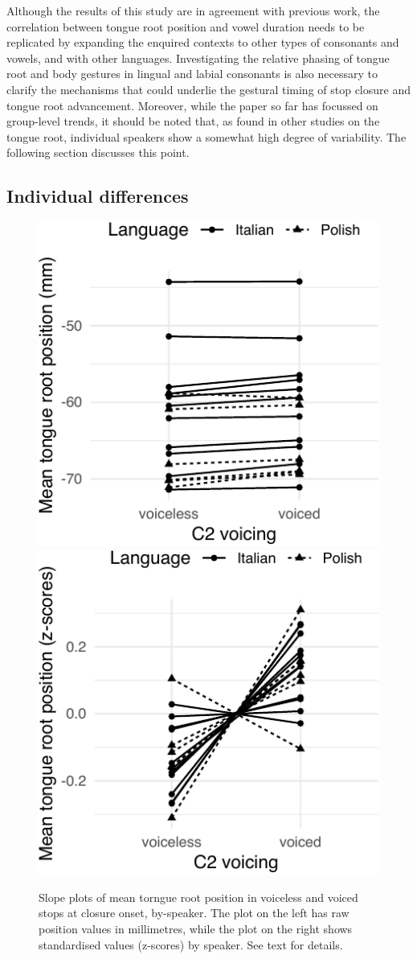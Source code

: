 \documentclass[
  12pt,
]{article}
\begin{document}
Although the results of this study are in agreement with previous work,
the correlation between tongue root position and vowel duration needs to
be replicated by expanding the enquired contexts to other types of
consonants and vowels, and with other languages. Investigating the
relative phasing of tongue root and body gestures in lingual and labial
consonants is also necessary to clarify the mechanisms that could
underlie the gestural timing of stop closure and tongue root
advancement. Moreover, while the paper so far has focussed on
group-level trends, it should be noted that, as found in other studies
on the tongue root, individual speakers show a somewhat high degree of
variability. The following section discusses this point.

\hypertarget{individual-differences}{%
\subsection{Individual differences}\label{individual-differences}}

\label{s:idio}

\begin{figure}

{\centering \includegraphics[width=.49\linewidth]{2018-tra_files/figure-latex/trp-voicing-plot-1} \includegraphics[width=.49\linewidth]{2018-tra_files/figure-latex/trp-voicing-plot-2} 

}

\caption{Slope plots of mean torngue root position in voiceless and voiced stops at closure onset, by-speaker. The plot on the left has raw position values in millimetres, while the plot on the right shows standardised values (z-scores) by speaker. See text for details.}\label{f:trp-voicing-plot}
\end{figure}
\end{document}
